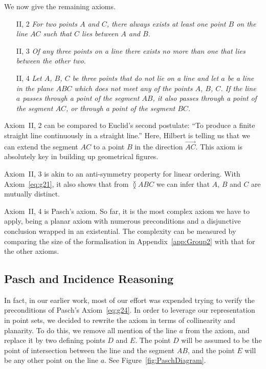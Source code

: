 We now give the remaining axioms.
\begin{enumerate}
  \item[II, 2] \emph{For two points $A$ and $C$, there always exists at least one point $B$ on the line $AC$ such that $C$ lies between $A$ and $B$.}
  \item[II, 3] \emph{Of any three points on a line there exists no more than one that lies between the other two.}
  \item[II, 4] \emph{Let $A$, $B$, $C$ be three points that do not lie on a line and let $a$ be a line in the plane $ABC$ which does not meet any of the points $A$, $B$, $C$. If the line $a$ passes through a point of the segment $AB$, it also passes through a point of the segment $AC$, or through a point of the segment $BC$.}
\end{enumerate}

Axiom~II, 2 can be compared to Euclid's second postulate: ``To produce a finite straight line continuously in a straight line.'' Here, Hilbert is telling us that we can extend the segment $AC$ to a point $B$ in the direction $\overrightarrow{AC}$. This axiom is absolutely key in building up geometrical figures.

Axiom~II, 3 is akin to an anti-symmetry property for linear ordering. With Axiom~\ref{eq:g21}, it also shows that from $\between{A}{B}{C}$ we can infer that $A$, $B$ and $C$ are mutually distinct. 

Axiom~II, 4 is Pasch's axiom. So far, it is the most complex axiom we have to apply, being a planar axiom with numerous preconditions and a disjunctive conclusion wrapped in an existential. The complexity can be measured by comparing the size of the formalisation in Appendix~\ref{app:Group2} with that for the other axioms.

\subsection{Pasch and Incidence Reasoning}
In fact, in our earlier work, most of our effort was expended trying to verify the preconditions of Pasch's Axiom~\eqref{eq:g24}. In order to leverage our representation in point sets, we decided to rewrite the axiom in terms of collinearity and planarity. To do this, we remove all mention of the line $a$ from the axiom, and replace it by two defining points $D$ and $E$. The point $D$ will be assumed to be the point of intersection between the line and the segment $AB$, and the point $E$ will be any other point on the line $a$. See Figure~\ref{fig:PaschDiagram}.

